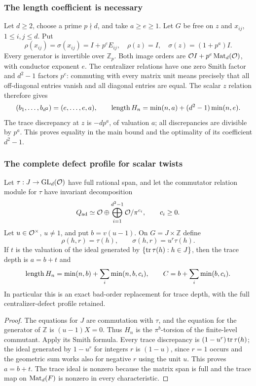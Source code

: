 \subsubsection{The length coefficient is necessary}

\begin{example}\label{ex:length}
Let $d\ge2$, choose a prime $p\nmid d$, and take $a\ge e\ge1$. Let $G$
be free on $z$ and $x_{ij}$, $1\le i,j\le d$. Put
\[
 \rho(x_{ij})=\sigma(x_{ij})=I+p^eE_{ij},\quad
 \rho(z)=I,\quad\sigma(z)=(1+p^a)I.
\]
Every generator is invertible over $\mathbb Z_p$. Both image orders are
$\mathcal O I+p^e\operatorname{Mat}_d(\mathcal O)$, with conductor exponent $e$. The centralizer
relations have one zero Smith factor and $d^2-1$ factors $p^e$:
commuting with every matrix unit means precisely that all off-diagonal
entries vanish and all diagonal entries are equal. The scalar $z$
relation therefore gives
\[
 (b_1,\ldots,b_{d^2})=(e,\ldots,e,a),\qquad
 \operatorname{length} H_n=\min(n,a)+(d^2-1)\min(n,e).
\]
The trace discrepancy at $z$ is $-dp^a$, of valuation $a$; all
discrepancies are divisible by $p^a$. This proves equality in the main
bound and the optimality of its coefficient $d^2-1$.
\end{example}

\subsubsection{The complete defect profile for scalar twists}

\begin{proposition}\label{prop:scalar}
Let $\tau:J\to\operatorname{GL}_d(\mathcal O)$ have full rational span, and let the
commutator relation module for $\tau$ have invariant decomposition
\[
 Q_{\rm ad}\simeq\mathcal O\oplus\bigoplus_{i=1}^{d^2-1}\mathcal O/\pi^{c_i},
 \qquad c_i\ge0.
\]
Let $u\in\mathcal O^\times$, $u\ne1$, and put $b=v(u-1)$. On
$G=J\times\mathbb Z$ define
\[
 \rho(h,r)=\tau(h),\qquad\sigma(h,r)=u^r\tau(h).
\]
If $t$ is the valuation of the ideal generated by
$\{\operatorname{tr}\tau(h):h\in J\}$, then the trace depth is $a=b+t$ and
\[
 \operatorname{length} H_n=\min(n,b)+\sum_i\min(n,b,c_i),\qquad
 C=b+\sum_i\min(b,c_i).
\]
In particular this is an exact bad-order replacement for trace depth,
with the full centralizer-defect profile retained.
\end{proposition}
\begin{proof}
The equations for $J$ are commutation with $\tau$, and the equation for
the generator of $\mathbb Z$ is $(u-1)X=0$. Thus $H_n$ is the
$\pi^b$-torsion of the finite-level commutant. Apply its Smith formula.
Every trace discrepancy is $(1-u^r)\operatorname{tr}\tau(h)$; the ideal generated by
$1-u^r$ for integers $r$ is $(1-u)$, since $r=1$ occurs and the geometric
sum works also for negative $r$ using the unit $u$. This proves $a=b+t$.
The trace ideal is nonzero because the matrix span is full and the trace
map on $\operatorname{Mat}_d(F)$ is nonzero in every characteristic.
\end{proof}

